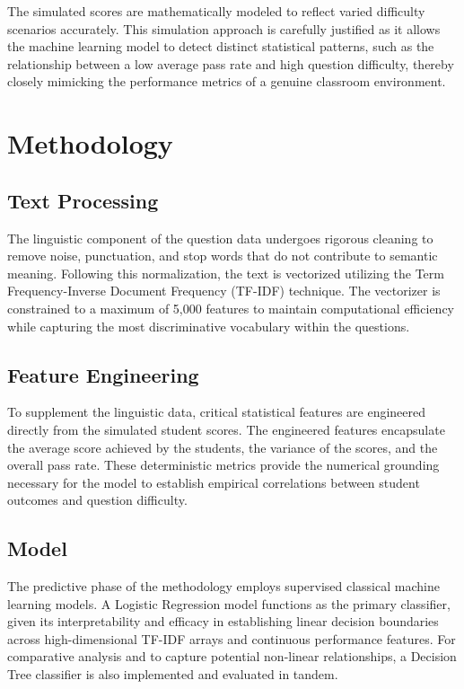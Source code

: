 \documentclass[12pt,a4paper]{article}
\begin{document}
The simulated scores are mathematically modeled to reflect varied difficulty scenarios accurately. This simulation approach is carefully justified as it allows the machine learning model to detect distinct statistical patterns, such as the relationship between a low average pass rate and high question difficulty, thereby closely mimicking the performance metrics of a genuine classroom environment.

\section{Methodology}

\subsection{Text Processing}
The linguistic component of the question data undergoes rigorous cleaning to remove noise, punctuation, and stop words that do not contribute to semantic meaning. Following this normalization, the text is vectorized utilizing the Term Frequency-Inverse Document Frequency (TF-IDF) technique. The vectorizer is constrained to a maximum of 5,000 features to maintain computational efficiency while capturing the most discriminative vocabulary within the questions.

\subsection{Feature Engineering}
To supplement the linguistic data, critical statistical features are engineered directly from the simulated student scores. The engineered features encapsulate the average score achieved by the students, the variance of the scores, and the overall pass rate. These deterministic metrics provide the numerical grounding necessary for the model to establish empirical correlations between student outcomes and question difficulty.

\subsection{Model}
The predictive phase of the methodology employs supervised classical machine learning models. A Logistic Regression model functions as the primary classifier, given its interpretability and efficacy in establishing linear decision boundaries across high-dimensional TF-IDF arrays and continuous performance features. For comparative analysis and to capture potential non-linear relationships, a Decision Tree classifier is also implemented and evaluated in tandem.
\end{document}
